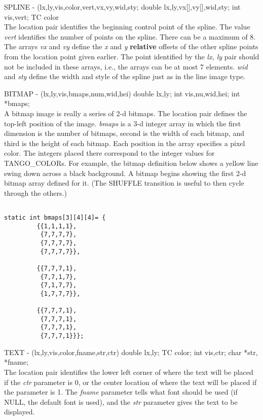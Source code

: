 SPLINE - (lx,ly,vis,color,vert,vx,vy,wid,sty; double lx,ly,vx[],vy[],wid,sty;
int vis,vert; TC color\\
The location pair identifies the beginning control point of the spline.  The
value {\em vert} identifies the number of points on the spline.
There can be a maximum of 8.  The arrays {\em vx} and {\em vy} define the
{\em x} and {\em y} {\bf relative} offsets of the other spline points from
the location point given earlier.  The point identified by the {\em lx, ly}
pair should not be included in these arrays, i.e., the arrays can be at most 7
elements.  {\em wid} and {\em sty} define the width and style of the spline
just as in the line image type.

BITMAP - (lx,ly,vis,bmaps,num,wid,hei) double lx,ly; int vis,nu,wid,hei; int *bmaps;\\
A bitmap image is really a series of 2-d bitmaps.  The location pair
defines the top-left position of the image.  {\em bmaps} is a 3-d integer
array in which the first dimension is the number of bitmaps, second is
the width of each bitmap, and third is the height of each bitmap.
Each position in the array specifies a pixel color.  The integers
placed there correspond to the integer values for TANGO\_COLORs.  For
example, the bitmap definition below shows a yellow line swing down
across a black background.  A bitmap begins showing the first 2-d
bitmap array defined for it.  (The SHUFFLE transition is useful to
then cycle through the others.)

\begin{verbatim}

static int bmaps[3][4][4]= {
         {{1,1,1,1},
          {7,7,7,7},
          {7,7,7,7},
          {7,7,7,7}},

         {{7,7,7,1},
          {7,7,1,7},
          {7,1,7,7},
          {1,7,7,7}},

         {{7,7,7,1},
          {7,7,7,1},
          {7,7,7,1},
          {7,7,7,1}}};

\end{verbatim}

TEXT - (lx,ly,vis,color,fname,str,ctr) double lx,ly; TC color; int vis,ctr;
char *str, *fname;\\
The location pair identifies the lower left corner of where the text will be
placed if the {\em ctr} parameter is 0, or the center location of where
the text will be placed if the parameter is 1.  The {\em fname} parameter
tells what font should be used (if NULL, the default font is used), and the
{\em str} parameter gives the text to be displayed.

